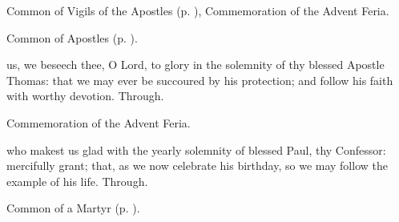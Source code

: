 

\begin{rubric}
	Common of Vigils of the Apostles (p. \pageref{CommonVigilApostles}), Commemoration of the Advent Feria.
\end{rubric}



\begin{rubric}
	Common of Apostles (p. \pageref{CommonApostles}).
\end{rubric}


\collect
{} us, we beseech thee, O Lord, to glory in the solemnity of thy blessed Apostle Thomas: that we may ever be succoured by his protection; and follow his faith with worthy devotion. Through.

\begin{rubric}
    Commemoration of the Advent Feria.
\end{rubric}



\memorialCollect
{} who makest us glad with the yearly solemnity of blessed Paul, thy Confessor: mercifully grant; that, as we now celebrate his birthday, so we may follow the example of his life. Through.



\begin{rubric}
	Common of a Martyr (p. \pageref{CommonMartyrBishopCollect}).
\end{rubric}


